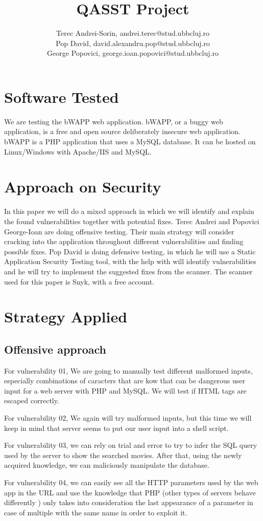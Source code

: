 \documentclass{article}
\title{\textbf{QASST Project}}
\author{Terec Andrei-Sorin, andrei.terec@stud.ubbcluj.ro\\
Pop David, david.alexandru.pop@stud.ubbcluj.ro\\
George Popovici, george.ioan.popovici@stud.ubbcluj.ro}
\begin{document}
\maketitle


\tableofcontents

\newpage

\section{Software Tested}
\label{label:Software_tested}

We are testing the bWAPP web application. \cite{bwapp}
bWAPP, or a buggy web application, is a free and open source deliberately insecure web application.
bWAPP is a PHP application that uses a MySQL database. It can be hosted on Linux/Windows with Apache/IIS and MySQL.

\section{Approach on Security}
\label{}

In this paper we will do a mixed approach in which we will identify and explain the found vulnerabilities together with potential fixes.
Terec Andrei and Popovici George-Ioan are doing offensive testing. Their main strategy will consider cracking into the application throughout different vulnerabilities and finding possible fixes. Pop David is doing defensive testing, in which he will use a Static Application Security Testing tool, with the help with will identify vulnerabilities and he will try to implement the suggested fixes from the scanner. The scanner used for this paper is Snyk, with a free account.

\section{Strategy Applied}
\label{}

\subsection{Offensive approach}
\par For vulnerability 01, We are going to manually test different malformed inputs, especially combinations of caracters that are kow that can be dangerous user input for a web server with PHP and MySQL. We will test if HTML tags are escaped correctly.
\par For vulnerability 02, We again will try malformed inputs, but this time we will keep in mind that server seems to put our user input into a shell script.
\par For vulnerability 03, we can rely on trial and error to try to infer the SQL query used by the server to show the searched movies. After that, using the newly acquired knowledge, we can maliciously manipulate the database.
\par For vulnerability 04, we can easily see all the HTTP parameters used by the web app in the URL and use the knowledge that PHP (other types of servers behave differently \cite{vul:httppp-extra}) only takes into consideration the last appearance of a parameter in case of multiple with the same name in order to exploit it.
\end{document}
